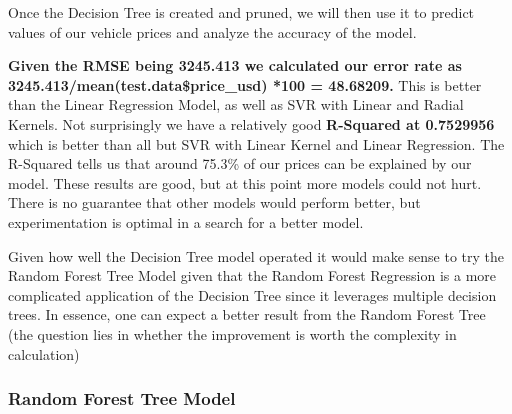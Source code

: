 \documentclass[
]{article}
\newenvironment{Shaded}{\begin{snugshade}}{\end{snugshade}}
\newcommand{\CommentTok}[1]{\textcolor[rgb]{0.56,0.35,0.01}{\textit{#1}}}
\newcommand{\FunctionTok}[1]{\textcolor[rgb]{0.00,0.00,0.00}{#1}}
\newcommand{\NormalTok}[1]{#1}
\newcommand{\OtherTok}[1]{\textcolor[rgb]{0.56,0.35,0.01}{#1}}
\newcommand{\SpecialCharTok}[1]{\textcolor[rgb]{0.00,0.00,0.00}{#1}}
\begin{document}
Once the Decision Tree is created and pruned, we will then use it to
predict values of our vehicle prices and analyze the accuracy of the
model.

\begin{Shaded}
\end{Shaded}

\textbf{Given the RMSE being 3245.413 we calculated our error rate as
3245.413/mean(test.data\$price\_usd) *100 = 48.68209.} This is better
than the Linear Regression Model, as well as SVR with Linear and Radial
Kernels. Not surprisingly we have a relatively good \textbf{R-Squared at
0.7529956} which is better than all but SVR with Linear Kernel and
Linear Regression. The R-Squared tells us that around 75.3\% of our
prices can be explained by our model. These results are good, but at
this point more models could not hurt. There is no guarantee that other
models would perform better, but experimentation is optimal in a search
for a better model.

Given how well the Decision Tree model operated it would make sense to
try the Random Forest Tree Model given that the Random Forest Regression
is a more complicated application of the Decision Tree since it
leverages multiple decision trees. In essence, one can expect a better
result from the Random Forest Tree (the question lies in whether the
improvement is worth the complexity in calculation)

\hypertarget{random-forest-tree-model}{%
\subsubsection{Random Forest Tree
Model}\label{random-forest-tree-model}}
\end{document}
